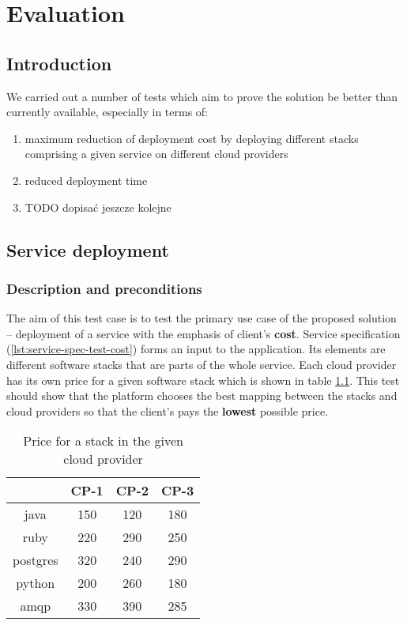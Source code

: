 \chapter{Evaluation}


\section{Introduction}
We carried out a number of tests which aim to prove the solution be better than currently available, especially in terms of:
\begin{enumerate}
  \item maximum reduction of deployment cost by deploying different stacks comprising a given service on different cloud providers
  \item reduced deployment time
  \item TODO dopisać jeszcze kolejne
\end{enumerate}

\section{Service deployment}
\subsection{Description and preconditions}
The aim of this test case is to test the primary use case of the proposed solution -- deployment of a service with the emphasis of client's \textbf{cost}.
Service specification (\ref{lst:service-spec-test-cost}) forms an input to the application. Its elements are different software stacks that are parts of the whole service. Each cloud provider has its own price for a given software stack which is shown in table \ref{tbl:test-service-deployment-cost}.
This test should show that the platform chooses the best mapping between the stacks and cloud providers so that the client's pays the \textbf{lowest} possible price.

\begin{table}
  \centering
  \begin{tabular}{ | c | c | c | c | }
    \hline                        
    & CP-1 & CP-2 & CP-3 \\
    \hline
    java      & 150 & 120 & 180 \\
    ruby      & 220 & 290 & 250 \\
    postgres  & 320 & 240 & 290 \\
    python    & 200 & 260 & 180 \\
    amqp      & 330 & 390 & 285 \\
    \hline  
  \end{tabular}
  \caption{Price for a stack in the given cloud provider}
  \label{tbl:test-service-deployment-cost}
\end{table}

